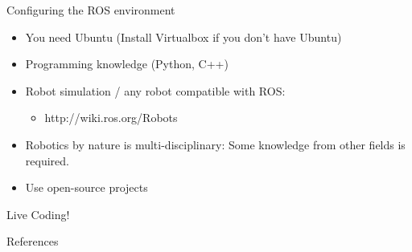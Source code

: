 \documentclass{beamer}
\begin{document}
	\begin{frame}
		Configuring the ROS environment
		\begin{itemize}
			\item You need Ubuntu (Install Virtualbox if you don't have Ubuntu)
			\item  Programming knowledge (Python, C++)
			\item Robot simulation / any robot compatible with ROS:
			\begin{itemize}
				\item http://wiki.ros.org/Robots
			\end{itemize}
			\item Robotics by nature is multi-disciplinary:	Some knowledge from other fields is required.
			\item Use open-source projects
		\end{itemize}
	\end{frame}
	\begin{frame}
	\centering
		\huge Live Coding!
	\end{frame}
	\begin{frame}
		References
	\end{frame}
\end{document}
